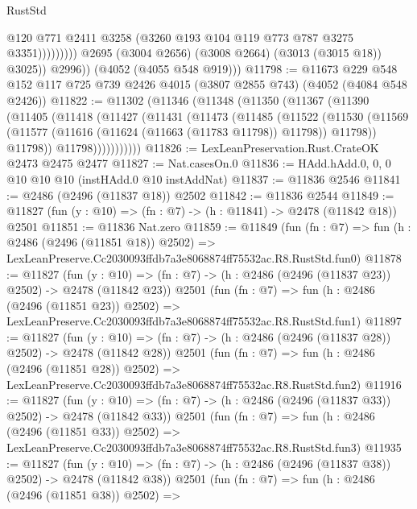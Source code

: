\begin{lexlean}{RustStd}
\begin{coremodule}
                              @120
                              @771
                              @2411
                              @3258
                              (@3260 @193 @104 @119 @773 @787 @3275 @3351)))))))))
              @2695
              (@3004 @2656)
              (@3008 @2664)
              (@3013 (@3015 @18))
              @3025))
          @2996))
      (@4052 (@4055 @548 @919)))
@11798 := @11673
    @229
    @548
    @152
    @117
    @725
    @739
    @2426
    @4015
    (@3807 @2855 @743)
    (@4052 (@4084 @548 @2426))
@11822 := @11302
    (@11346
      (@11348
        (@11350
          (@11367
            (@11390
              (@11405
                (@11418
                  (@11427
                    (@11431
                      (@11473
                        (@11485
                          (@11522
                            (@11530
                              (@11569
                                (@11577 (@11616 (@11624 (@11663 (@11783 @11798)) @11798)) @11798))
                              @11798))
                          @11798)))))))))))
@11826 := LexLeanPreservation.Rust.CrateOK @2473 @2475 @2477
@11827 := Nat.casesOn.{0}
@11836 := HAdd.hAdd.{0, 0, 0} @10 @10 @10 (instHAdd.{0} @10 instAddNat)
@11837 := @11836 @2546
@11841 := @2486 (@2496 (@11837 @18)) @2502
@11842 := @11836 @2544
@11849 := @11827 (fun (y : @10) => (fn : @7) -> (h : @11841) -> @2478 (@11842 @18)) @2501
@11851 := @11836 Nat.zero
@11859 := @11849
    (fun (fn : @7) =>
    fun (h : @2486 (@2496 (@11851 @18)) @2502) =>
    LexLeanPreserve.Cc2030093ffdb7a3e8068874ff75532ac.R8.RustStd.fun0)
@11878 := @11827
    (fun (y : @10) => (fn : @7) -> (h : @2486 (@2496 (@11837 @23)) @2502) -> @2478 (@11842 @23))
    @2501
    (fun (fn : @7) =>
    fun (h : @2486 (@2496 (@11851 @23)) @2502) =>
    LexLeanPreserve.Cc2030093ffdb7a3e8068874ff75532ac.R8.RustStd.fun1)
@11897 := @11827
    (fun (y : @10) => (fn : @7) -> (h : @2486 (@2496 (@11837 @28)) @2502) -> @2478 (@11842 @28))
    @2501
    (fun (fn : @7) =>
    fun (h : @2486 (@2496 (@11851 @28)) @2502) =>
    LexLeanPreserve.Cc2030093ffdb7a3e8068874ff75532ac.R8.RustStd.fun2)
@11916 := @11827
    (fun (y : @10) => (fn : @7) -> (h : @2486 (@2496 (@11837 @33)) @2502) -> @2478 (@11842 @33))
    @2501
    (fun (fn : @7) =>
    fun (h : @2486 (@2496 (@11851 @33)) @2502) =>
    LexLeanPreserve.Cc2030093ffdb7a3e8068874ff75532ac.R8.RustStd.fun3)
@11935 := @11827
    (fun (y : @10) => (fn : @7) -> (h : @2486 (@2496 (@11837 @38)) @2502) -> @2478 (@11842 @38))
    @2501
    (fun (fn : @7) =>
    fun (h : @2486 (@2496 (@11851 @38)) @2502) =>

\end{coremodule}
\end{lexlean}
